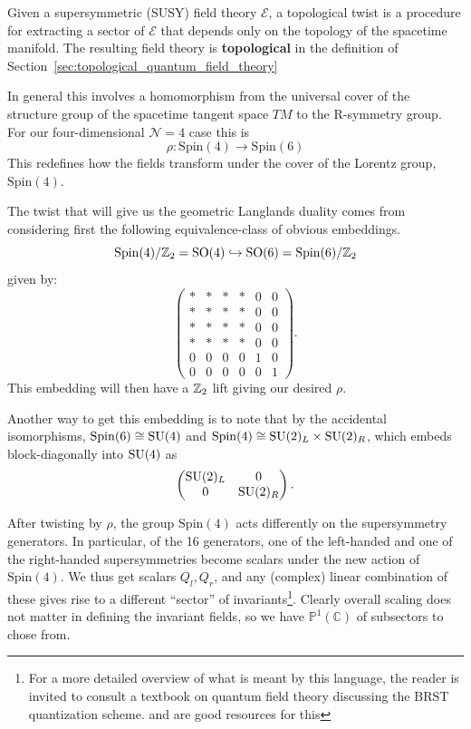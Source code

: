 	\begin{phys}
		Given a supersymmetric (SUSY) field theory $\mathcal E$, a topological twist is a procedure for extracting a sector of $\mathcal E$ that depends only on the topology of the spacetime manifold. The resulting field theory is \textbf{topological} in the definition of Section~\ref{sec:topological_quantum_field_theory}
	\end{phys}
	In general this involves a homomorphism from the universal cover of the structure group of the spacetime tangent space $TM$ to the R-symmetry group. For our four-dimensional $\mathcal N = 4$ case this is
	$$\rho : \mathrm{Spin}(4) \to \mathrm{Spin}(6)$$
	This redefines how the fields transform under the cover of the Lorentz group, $\mathrm{Spin}(4)$. 
	
	The twist that will give us the geometric Langlands duality comes from considering first the following equivalence-class of obvious embeddings.
	$$\mathrm{Spin}(4)/\mathbb{Z}_2 = \mathrm{SO}(4) \hookrightarrow \mathrm{SO}(6) = \mathrm{Spin}(6)/\mathbb{Z}_2$$
	given by:
	\[
		\begin{pmatrix}
			* & * & * & * & 0 & 0 \\
			* & * & * & * & 0 & 0 \\
			* & * & * & * & 0 & 0 \\
			* & * & * & * & 0 & 0 \\
			0 & 0 & 0 & 0 & 1 & 0 \\
			0 & 0 & 0 & 0 & 0 & 1
		\end{pmatrix}.
	\]
	This embedding will then have a $\mathbb{Z}_2$ lift giving our desired $\rho$. 
	
	Another way to get this embedding is to note that by the accidental isomorphisms, $\mathrm{Spin}(6) \cong \mathrm{SU}(4)$ and $\mathrm{Spin}(4) \cong \mathrm{SU}(2)_L \times \mathrm{SU}(2)_R$, which embeds block-diagonally into $\mathrm{SU}(4)$ as
	\[
		\begin{pmatrix}
			\mathrm{SU}(2)_L & 0 \\
			0 & \mathrm{SU}(2)_R
		\end{pmatrix}.
	\]
	
	After twisting by $\rho$, the group $\mathrm{Spin}(4)$ acts differently on the supersymmetry generators. In particular, of the 16 generators, one of the left-handed and one of the right-handed supersymmetries become scalars under the new action of $\mathrm{Spin}(4)$. We thus get scalars $Q_l, Q_r$, and any (complex) linear combination of these gives rise to a different ``sector'' of invariants\footnote{For a more detailed overview of what is meant by this language, the reader is invited to consult a textbook on quantum field theory discussing the BRST quantization scheme. \cite{van2005aspects} and \cite{weinberg1995quantum} are good resources for this}. Clearly overall scaling does not matter in defining the invariant fields, so we have $\mathbb P^1 (\mathbb C)$ of subsectors to chose from.
	
